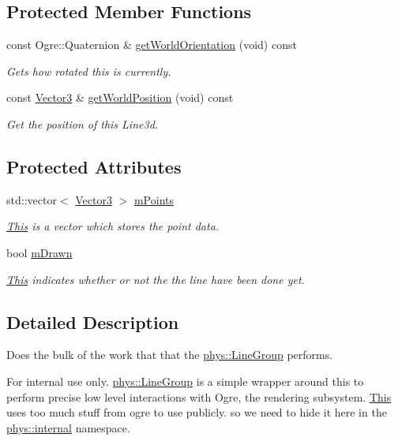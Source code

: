 \subsection*{Protected Member Functions}
\begin{DoxyCompactItemize}
\item 
const Ogre::Quaternion \& \hyperlink{classphys_1_1internal_1_1Line3D_a68aea39fc0eee3eeb744c5cd151ef209}{getWorldOrientation} (void) const 
\begin{DoxyCompactList}\small\item\em Gets how rotated this is currently. \item\end{DoxyCompactList}\item 
const \hyperlink{classphys_1_1Vector3}{Vector3} \& \hyperlink{classphys_1_1internal_1_1Line3D_a5bf47edcb7d369718c40c56d9db11b29}{getWorldPosition} (void) const 
\begin{DoxyCompactList}\small\item\em Get the position of this Line3d. \item\end{DoxyCompactList}\end{DoxyCompactItemize}
\subsection*{Protected Attributes}
\begin{DoxyCompactItemize}
\item 
std::vector$<$ \hyperlink{classphys_1_1Vector3}{Vector3} $>$ \hyperlink{classphys_1_1internal_1_1Line3D_acb6b813e2d713dbad02fe5a5ca1af97e}{mPoints}
\begin{DoxyCompactList}\small\item\em \hyperlink{structThis}{This} is a vector which stores the point data. \item\end{DoxyCompactList}\item 
bool \hyperlink{classphys_1_1internal_1_1Line3D_a7f3a190db3c0cd83ff4fdf3d95d6f0ee}{mDrawn}
\begin{DoxyCompactList}\small\item\em \hyperlink{structThis}{This} indicates whether or not the the line have been done yet. \item\end{DoxyCompactList}\end{DoxyCompactItemize}


\subsection{Detailed Description}
Does the bulk of the work that that the \hyperlink{classphys_1_1LineGroup}{phys::LineGroup} performs. \begin{DoxyInternal}{For internal use only.}
\hyperlink{classphys_1_1LineGroup}{phys::LineGroup} is a simple wrapper around this to perform precise low level interactions with Ogre, the rendering subsystem. \hyperlink{structThis}{This} uses too much stuff from ogre to use publicly. so we need to hide it here in the \hyperlink{namespacephys_1_1internal}{phys::internal} namespace. \end{DoxyInternal}


